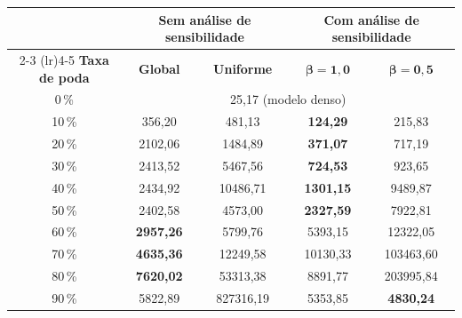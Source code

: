 \begin{tabular}{c cc cc}
\toprule
& \multicolumn{2}{c}{\textbf{Sem análise de sensibilidade}} & \multicolumn{2}{c}{\textbf{Com análise de sensibilidade}} \\
\cmidrule(lr){2-3} \cmidrule(lr){4-5}
\textbf{Taxa de poda} & \textbf{Global} & \textbf{Uniforme} & $\boldsymbol{\beta = 1{,}0}$ & $\boldsymbol{\beta = 0{,}5}$ \\
\midrule
0\,\% & \multicolumn{4}{c}{25,17 (modelo denso)} \\
10\,\% & 356,20 & 481,13 & \textbf{124,29} & 215,83 \\
20\,\% & 2102,06 & 1484,89 & \textbf{371,07} & 717,19 \\
30\,\% & 2413,52 & 5467,56 & \textbf{724,53} & 923,65 \\
40\,\% & 2434,92 & 10486,71 & \textbf{1301,15} & 9489,87 \\
50\,\% & 2402,58 & 4573,00 & \textbf{2327,59} & 7922,81 \\
60\,\% & \textbf{2957,26} & 5799,76 & 5393,15 & 12322,05 \\
70\,\% & \textbf{4635,36} & 12249,58 & 10130,33 & 103463,60 \\
80\,\% & \textbf{7620,02} & 53313,38 & 8891,77 & 203995,84 \\
90\,\% & 5822,89 & 827316,19 & 5353,85 & \textbf{4830,24} \\
\bottomrule
\end{tabular}
